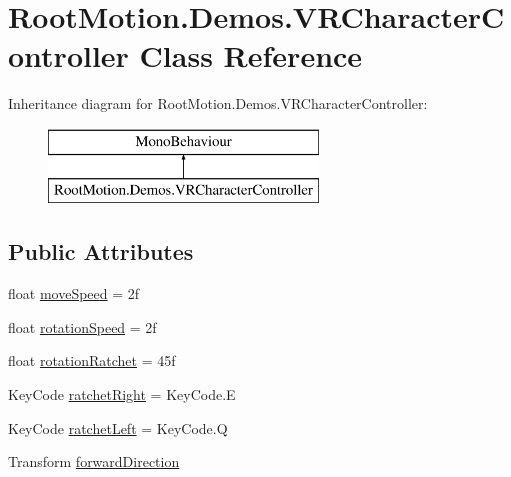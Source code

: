 \hypertarget{class_root_motion_1_1_demos_1_1_v_r_character_controller}{}\section{Root\+Motion.\+Demos.\+V\+R\+Character\+Controller Class Reference}
\label{class_root_motion_1_1_demos_1_1_v_r_character_controller}
Inheritance diagram for Root\+Motion.\+Demos.\+V\+R\+Character\+Controller\+:\begin{figure}[H]
\begin{center}
\leavevmode
\includegraphics[height=2.000000cm]{class_root_motion_1_1_demos_1_1_v_r_character_controller}
\end{center}
\end{figure}
\subsection*{Public Attributes}
\begin{DoxyCompactItemize}
\item 
float \mbox{\hyperlink{class_root_motion_1_1_demos_1_1_v_r_character_controller_adf7ef930f19d65400f7bc1c4ef93fde9}{move\+Speed}} = 2f
\item 
float \mbox{\hyperlink{class_root_motion_1_1_demos_1_1_v_r_character_controller_af8dce185b85e4f417c6be878447044fd}{rotation\+Speed}} = 2f
\item 
float \mbox{\hyperlink{class_root_motion_1_1_demos_1_1_v_r_character_controller_af898637dfbfc0756536d005b3cd15c75}{rotation\+Ratchet}} = 45f
\item 
Key\+Code \mbox{\hyperlink{class_root_motion_1_1_demos_1_1_v_r_character_controller_abf431d448c2406d8ef69a04e2bb25235}{ratchet\+Right}} = Key\+Code.\+E
\item 
Key\+Code \mbox{\hyperlink{class_root_motion_1_1_demos_1_1_v_r_character_controller_ad6bb82e82fefa5211350a63cc185235a}{ratchet\+Left}} = Key\+Code.\+Q
\item 
Transform \mbox{\hyperlink{class_root_motion_1_1_demos_1_1_v_r_character_controller_a4084aec8f4578342b3b20a33642a2764}{forward\+Direction}}
\end{DoxyCompactItemize}


